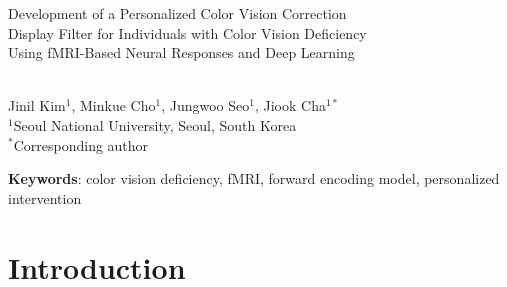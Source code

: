 \documentclass[12pt,a4paper]{article}
\date{}  %
\begin{document}

\thispagestyle{empty} %

\begin{center}
{\Large
{}
\parbox{\textwidth}{\centering
Development of a Personalized Color Vision Correction \\[1.2em]
Display Filter for Individuals with Color Vision Deficiency \\[1.2em]
Using fMRI-Based Neural Responses and Deep Learning
}} \\[8ex]

{\large Jinil Kim$^{1}$, Minkue Cho$^{1}$, Jungwoo Seo$^{1}$, Jiook Cha$^{1*}$} \\[3ex]
{\small
$^{1}$Seoul National University, Seoul, South Korea \\
$^{*}$Corresponding author
}
\end{center}

\begin{abstract}
Color vision deficiency (CVD) affects approximately 8\% of males, yet neural mechanisms and individual variability remain poorly understood. We investigated whether individuals with CVD maintain neural color discrimination despite retinal deficits, whether CVD exhibits individual heterogeneity requiring personalized interventions, and whether neural profiles can inform filter design. Using fMRI and forward encoding models, we characterized color representations in early visual cortex (V1-hV4) of three CVD participants and five healthy controls. Three-dimensional neural analysis revealed preserved color discrimination in CVD. Subject-specific linear transformations achieved 97.2\% geometric alignment and significantly higher structural recovery when retrospectively applied to the training data. These findings provide evidence supporting the neurophysiological and computational feasibility of personalized neural-guided transformations, though prospective behavioral validation with filtered stimuli and independent test data remains to be conducted.
\end{abstract}

\textbf{Keywords}: color vision deficiency, fMRI, forward encoding model, personalized intervention

\section{Introduction}
\end{document}
